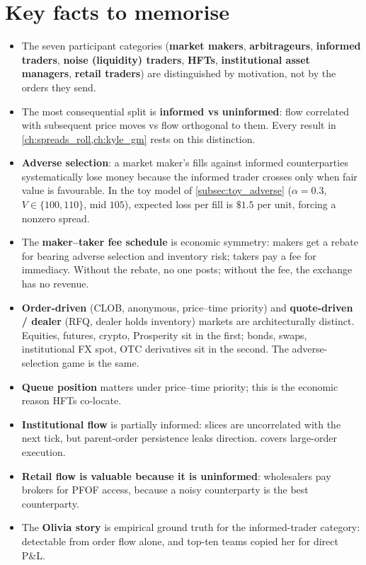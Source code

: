 \section{Key facts to memorise}
\label{sec:ch2_key_facts}

\begin{itemize}
  \item The seven participant categories (\textbf{market makers},
  \textbf{arbitrageurs}, \textbf{informed traders}, \textbf{noise
  (liquidity) traders}, \textbf{HFTs}, \textbf{institutional asset
  managers}, \textbf{retail traders}) are distinguished by
  motivation, not by the orders they send.

  \item The most consequential split is \textbf{informed vs
  uninformed}: flow correlated with subsequent price moves vs flow
  orthogonal to them. Every result in
  \cref{ch:spreads_roll,ch:kyle_gm} rests on this distinction.

  \item \textbf{Adverse selection}: a market maker's fills against
  informed counterparties systematically lose money because the
  informed trader crosses only when fair value is favourable. In the
  toy model of \cref{subsec:toy_adverse} ($\alpha = 0.3$, $V \in
  \{100, 110\}$, mid $105$), expected loss per fill is $\$1.5$ per
  unit, forcing a nonzero spread.

  \item The \textbf{maker--taker fee schedule} is economic symmetry:
  makers get a rebate for bearing adverse selection and inventory
  risk; takers pay a fee for immediacy. Without the rebate, no one
  posts; without the fee, the exchange has no revenue.

  \item \textbf{Order-driven} (CLOB, anonymous, price--time priority)
  and \textbf{quote-driven / dealer} (RFQ, dealer holds inventory)
  markets are architecturally distinct. Equities, futures, crypto,
  Prosperity sit in the first; bonds, swaps, institutional FX spot,
  OTC derivatives sit in the second. The adverse-selection game is
  the same.

  \item \textbf{Queue position} matters under price--time priority;
  this is the economic reason HFTs co-locate.

  \item \textbf{Institutional flow} is partially informed: slices are
  uncorrelated with the next tick, but parent-order persistence leaks
  direction.  covers large-order execution.

  \item \textbf{Retail flow is valuable because it is uninformed}:
  wholesalers pay brokers for PFOF access, because a noisy counterparty
  is the best counterparty.

  \item The \textbf{Olivia story} is empirical ground truth for the
  informed-trader category: detectable from order flow alone, and
  top-ten teams copied her for direct P\&L.
\end{itemize}
